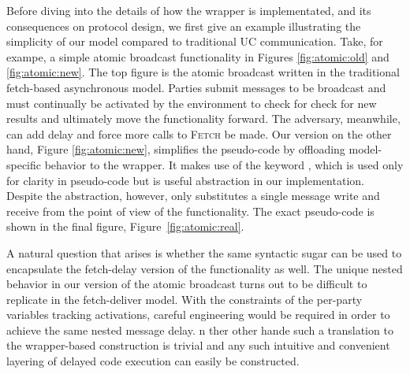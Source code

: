 Before diving into the details of how the wrapper is implementated, and its consequences on protocol design, we first give an example illustrating the simplicity of our model compared to traditional UC communication.
Take, for exampe, a simple atomic broadcast functionality in Figures \ref{fig:atomic:old} and \ref{fig:atomic:new}. 
The top figure is the atomic broadcast written in the traditional fetch-based asynchronous model.
Parties submit messages to be broadcast and must continually be activated by the environment to check for check for new results and ultimately move the functionality forward.
The adversary, meanwhile, can add delay and force more calls to \textsc{Fetch} be made.
Our version on the other hand, Figure \ref{fig:atomic:new}, simplifies the pseudo-code by offloading model-specific behavior to the wrapper.
It makes use of the keyword \Eventually, which is used only for clarity in pseudo-code but is useful abstraction in our implementation.
Despite the abstraction, however, \Eventually only substitutes a single message write and receive from the point of view of the functionality.
The exact pseudo-code is shown in the final figure, Figure~\ref{fig:atomic:real}.

A natural question that arises is whether the same \Eventually syntactic sugar can be used to encapsulate the fetch-delay version of the functionality as well. 
The unique nested \Eventually behavior in our version of the atomic broadcast turns out to be difficult to replicate in the fetch-deliver model.
With the constraints of the per-party variables tracking activations, careful engineering would be required in order to achieve the same nested message delay. 
n ther other hande such a translation to the wrapper-based construction is trivial and any such intuitive and convenient layering of delayed code execution can easily be constructed.

